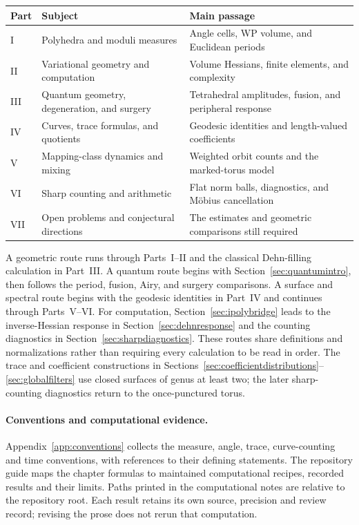 \documentclass[11pt,a4paper]{article}
\numberwithin{equation}{section}
\theoremstyle{definition}
\theoremstyle{remark}
\begin{document}
\begin{center}
\small
\begin{tabular}{@{}p{}p{}p{}@{}}
\toprule
Part & Subject & Main passage \\
\midrule
I & Polyhedra and moduli measures & Angle cells, WP volume, and Euclidean periods \\[4pt]
II & Variational geometry and computation & Volume Hessians, finite elements, and complexity \\[4pt]
III & Quantum geometry, degeneration, and surgery & Tetrahedral amplitudes, fusion, and peripheral response \\[4pt]
IV & Curves, trace formulas, and quotients & Geodesic identities and length-valued coefficients \\[4pt]
V & Mapping-class dynamics and mixing & Weighted orbit counts and the marked-torus model \\[4pt]
VI & Sharp counting and arithmetic & Flat norm balls, diagnostics, and M\"obius cancellation \\[4pt]
VII & Open problems and conjectural directions & The estimates and geometric comparisons still required \\
\bottomrule
\end{tabular}
\end{center}

A geometric route runs through Parts~I--II and the classical Dehn-filling
calculation in Part~III. A quantum route begins with
Section~\ref{sec:quantumintro}, then follows the period, fusion, Airy, and
surgery comparisons. A surface and spectral route begins with the
geodesic identities in Part~IV and continues through Parts~V--VI.
For computation, Section~\ref{sec:ipolybridge} leads to the inverse-Hessian
response in Section~\ref{sec:dehnresponse} and the counting diagnostics in
Section~\ref{sec:sharpdiagnostics}. These routes share definitions and
normalizations rather than requiring every calculation to be read in order.
The trace and coefficient constructions in
Sections~\ref{sec:coefficientdistributions}--\ref{sec:globalfilters}
use closed surfaces of genus at least two; the later sharp-counting
diagnostics return to the once-punctured torus.

\paragraph{Conventions and computational evidence.}
Appendix~\ref{app:conventions} collects the measure, angle, trace,
curve-counting and time conventions, with references to their defining
statements. The repository guide 
maps the chapter formulas to maintained computational recipes, recorded
results and their limits. Paths printed in the computational notes are
relative to the repository root. Each result retains its own source,
precision and review record; revising the prose does not rerun that computation.
\end{document}
